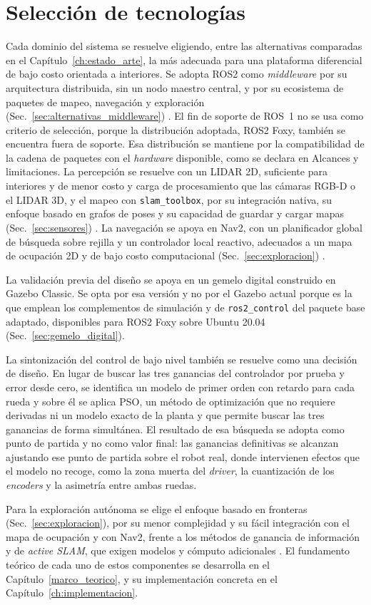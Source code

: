 \section{Selección de tecnologías}
\label{sec:seleccion_tecnologias}

Cada dominio del sistema se resuelve eligiendo, entre las alternativas
comparadas en el Capítulo~\ref{ch:estado_arte}, la más adecuada para una
plataforma diferencial de bajo costo orientada a interiores. Se adopta
\gls{ROS2} como \textit{middleware} por su arquitectura distribuida, sin un nodo maestro
central, y por su ecosistema de paquetes de mapeo, navegación y exploración
(Sec.~\ref{sec:alternativas_middleware}) \citep{macenski2022ros2}. El fin de
soporte de ROS~1 \citep{ros_noetic_eol} no se usa como criterio de selección,
porque la distribución adoptada, \gls{ROS2} Foxy, también se encuentra fuera de
soporte. Esa distribución se mantiene por la compatibilidad de la cadena de
paquetes con el \textit{hardware} disponible, como se declara en Alcances y
limitaciones. La percepción se resuelve con un
\gls{LIDAR} 2D, suficiente para interiores y de menor costo y carga de
procesamiento que las cámaras RGB-D o el \gls{LIDAR} 3D, y el mapeo con
\texttt{slam\_toolbox}, por su integración nativa, su enfoque basado en grafos
de poses y su capacidad de guardar y cargar mapas
(Sec.~\ref{sec:sensores}) \citep{macenski2021slamtoolbox}. La navegación se
apoya en Nav2, con un planificador global de búsqueda sobre rejilla y un
controlador local reactivo, adecuados a un mapa de ocupación 2D y de bajo costo
computacional (Sec.~\ref{sec:exploracion})
\citep{macenski2023desks}.

La validación previa del diseño se apoya en un gemelo digital construido
en Gazebo Classic. Se opta por esa versión y no por el Gazebo actual porque es
la que emplean los complementos de simulación y de \texttt{ros2\_control} del
paquete base adaptado, disponibles para \gls{ROS2} Foxy sobre Ubuntu 20.04
(Sec.~\ref{sec:gemelo_digital}).

La sintonización del control de bajo nivel también se resuelve como una
decisión de diseño. En lugar de buscar las tres ganancias del controlador por prueba y
error desde cero, se identifica un modelo de primer orden con retardo para cada
rueda y sobre él se aplica PSO, un método de optimización que no requiere
derivadas ni un modelo exacto de la planta y que permite buscar las tres
ganancias de forma simultánea. El resultado de esa búsqueda se adopta como punto de
partida y no como valor final: las ganancias definitivas se alcanzan ajustando
ese punto de partida sobre el robot real, donde intervienen efectos que el
modelo no recoge, como la zona muerta del \textit{driver}, la cuantización de los
\textit{encoders} y la asimetría entre ambas ruedas.

Para la exploración autónoma se elige el enfoque basado en fronteras
(Sec.~\ref{sec:exploracion}), por su menor complejidad y su fácil integración
con el mapa de ocupación y con Nav2, frente a los métodos de ganancia de
información y de \textit{active SLAM}, que exigen modelos y cómputo adicionales
\citep{placed2023active,alvarez2021mexplore_ros2}. El fundamento teórico de cada
uno de estos componentes se desarrolla en el Capítulo~\ref{marco_teorico}, y su
implementación concreta en el Capítulo~\ref{ch:implementacion}.

